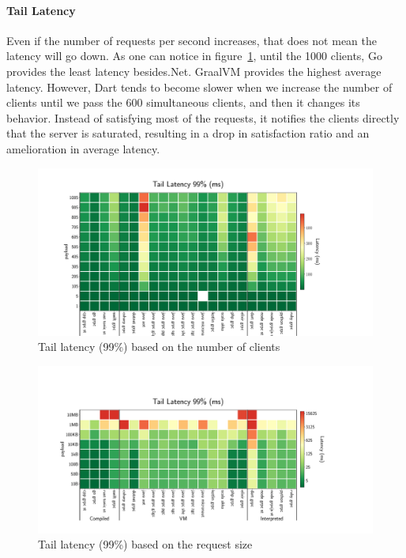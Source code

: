\paragraph{Tail Latency}
Even if the number of requests per second increases, that does not mean the latency will go down.
As one can notice in figure~\ref{fig:tail99_clients}, until the 1000 clients, Go provides the least latency besides.Net.
GraalVM provides the highest average latency.
However, Dart tends to become slower when we increase the number of clients until we pass the 600 simultaneous clients, and then it changes its behavior. Instead of satisfying most of the requests, it notifies the clients directly that the server is saturated, resulting in a drop in satisfaction ratio and an amelioration in average latency.

\begin{figure}[!hbt]
    \begin{center}
        \includegraphics[width=1.2\linewidth]{imgs/tail99_clients}
    \end{center}
    \caption{Tail latency (99\%) based on the number of clients}\label{fig:tail99_clients}
\end{figure}


\begin{figure}[!hbt]
    \begin{center}
        \includegraphics[width=1.2\linewidth]{imgs/tail99_payload}
    \end{center}
    \caption{Tail latency (99\%) based on the request size}\label{fig:tail99_payload}
\end{figure}


